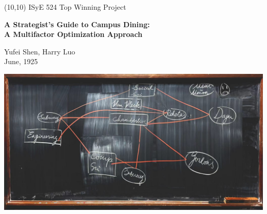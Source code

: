 \documentclass{article}
\begin{document}
\begin{textblock}{60}(10,10) %
  \normalsize ISyE 524 Top Winning Project 
\end{textblock}

\begin{titlepage}
    \centering %
    
    \vfill %
    
    \parbox{\textwidth}{
        \centering
        \huge\bfseries
        A Strategist's Guide to Campus Dining:\\[2ex]
        \mdseries\Large 
        A Multifactor Optimization Approach
    }
    
    \vfill %
    
    \parbox{0.8\textwidth}{
        \centering
        \large
        Yufei Shen, Harry Luo\\[1ex]
        June, 1925
    }
    
    \vfill %
    
    \parbox{0.9\textwidth}{
        \centering
        \includegraphics[width=\linewidth]{Dining_map.jpg}
        \label{fig:enter-label} %
    }
    
\end{titlepage}
\end{document}
